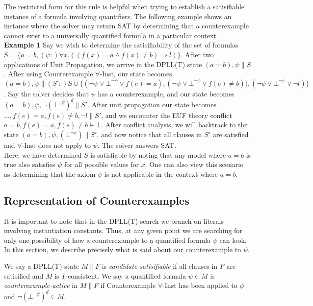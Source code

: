 \documentclass{llncs}
\begin{document}
The restricted form for this rule is helpful when trying to establish a satisifiable instance of a formula involving quantifiers.
The following example shows an instance where the solver may return SAT by determining that a counterexample cannot exist to a universally quantified formula in a particular context. \\

{\bf Example 1}
Say we wish to determine the satisifiability of the set of formulas $S = \{ a = b, (\psi :) \forall x. ((f(x) = a \wedge f(x) \neq b) \Rightarrow l) \}$.
After two applications of Unit Propagation, we arrive in the DPLL(T) state $( a = b ), \psi \parallel S$.
After using Counterexample $\forall$-Inst, our state becomes $( a = b ), \psi \parallel (S':) S \cup \{ (\neg \psi \vee \bot^{\neg \psi} \vee f( e ) = a), (\neg \psi \vee \bot^{\neg \psi} \vee f( e ) \neq b)), (\neg \psi \vee \bot^{\neg \psi} \vee \neg l) \}$.
Say the solver decides that $\psi$ has a counterexample, and our state becomes $( a = b ), \psi, \neg (\bot^{\neg \psi})^d \parallel S'$. 
After unit propagation our state becomes $\ldots, f( e ) = a, f( e ) \neq b, \neg l \parallel S'$, and we encounter the EUF theory conflict $a = b, f( e ) = a, f( e ) \neq b \models \bot$.
After conflict analysis, we will backtrack to the state $( a = b ), \psi, (\bot^{\neg \psi}) \parallel S'$, and now notice that all clauses in $S'$ are satisfied and $\forall$-Inst does not apply to $\psi$.
The solver answers SAT. \\

Here, we have determined $S$ is satisfiable by noting that any model where $a = b$ is true also satisfies $\psi$ for all possible values for $x$.
One can also view this scenario as determining that the axiom $\psi$ is not applicable in the context where $a = b$.

\subsection{Representation of Counterexamples}

It is important to note that in the DPLL(T) search we branch on literals involving instantiation constants.
Thus, at any given point we are searching for only one possibility of how a counterexample to a quantified formula $\psi$ can look.
In this section, we describe precisely what is said about our counterexample to $\psi$.

We say a DPLL(T) state $M \parallel F$ is \emph{candidate-satisifiable} if all clauses in $F$ are satisified and $M$ is $T$-consistent.
We say a quantified formula $\psi \in M$ is \emph{counterexample-active} in $M \parallel F$ if Counterexample $\forall$-Inst has been applied to $\psi$ and $\neg (\bot^{\neg \psi})^d \in M$.
\end{document}
